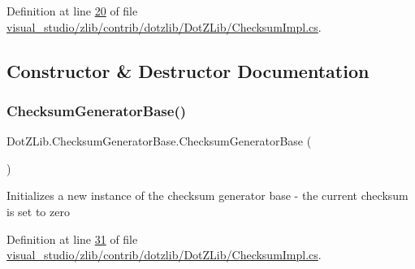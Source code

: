 Definition at line \hyperlink{visual__studio_2zlib_2contrib_2dotzlib_2_dot_z_lib_2_checksum_impl_8cs_source_l00020}{20} of file \hyperlink{visual__studio_2zlib_2contrib_2dotzlib_2_dot_z_lib_2_checksum_impl_8cs_source}{visual\+\_\+studio/zlib/contrib/dotzlib/\+Dot\+Z\+Lib/\+Checksum\+Impl.\+cs}.



\subsection{Constructor \& Destructor Documentation}
\mbox{\label{class_dot_z_lib_1_1_checksum_generator_base_a4c13ec1d2cb08abadffb2c70cb4ba258}} 
\subsubsection{\texorpdfstring{Checksum\+Generator\+Base()}{ChecksumGeneratorBase()}\hspace{0.1cm}{\footnotesize\ttfamily [1/4]}}
{\footnotesize\ttfamily Dot\+Z\+Lib.\+Checksum\+Generator\+Base.\+Checksum\+Generator\+Base (\begin{DoxyParamCaption}{ }\end{DoxyParamCaption})\hspace{0.3cm}{\ttfamily [inline]}}



Initializes a new instance of the checksum generator base -\/ the current checksum is set to zero 



Definition at line \hyperlink{visual__studio_2zlib_2contrib_2dotzlib_2_dot_z_lib_2_checksum_impl_8cs_source_l00031}{31} of file \hyperlink{visual__studio_2zlib_2contrib_2dotzlib_2_dot_z_lib_2_checksum_impl_8cs_source}{visual\+\_\+studio/zlib/contrib/dotzlib/\+Dot\+Z\+Lib/\+Checksum\+Impl.\+cs}.

\mbox{\label{class_dot_z_lib_1_1_checksum_generator_base_ab36da84d395361311a45e88797ae8c69}} 
